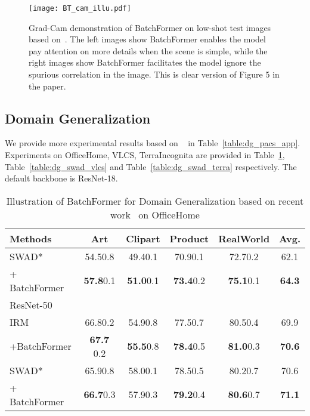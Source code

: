 \documentclass[10pt,twocolumn,letterpaper]{article}
\begin{document}
\begin{figure*}
    \centering
    \texttt{[image: BT\_cam\_illu.pdf]}
\caption{Grad-Cam demonstration of BatchFormer on low-shot test images based on~\cite{ren2020balanced}. The left images show BatchFormer enables the model pay attention on more details when the scene is simple, while the right images show BatchFormer facilitates the model ignore the spurious correlation in the image. This is clear version of Figure 5 in the paper.}
    \label{fig:cam_illu_app}
\end{figure*}


\subsection{Domain Generalization}

We provide more experimental results based on ~\cite{dalib} in Table~\ref{table:dg_pacs_app}. Experiments on OfficeHome, VLCS, TerraIncognita are provided in Table~\ref{table:dg_swad_officehome}, Table~\ref{table:dg_swad_vlcs} and Table~\ref{table:dg_swad_terra} respectively. The default backbone is ResNet-18.



\begin{table}[tp]
\small
\setlength\tabcolsep{2.5pt}
\caption{Illustration of BatchFormer for Domain Generalization based on recent work~\cite{cha2021swad} on OfficeHome }
\label{table:dg_swad_officehome}
\centering
\begin{tabular}{@{}lccccc@{}}
\hline
Methods  &  Art   & Clipart   & Product   & RealWorld & Avg.  \\
\hline
SWAD*~\cite{cha2021swad} & 54.50.8 & 49.40.1 & 70.90.1 & 72.70.2 & 62.1 \\
 + BatchFormer & {\bf 57.8}0.1 & {\bf 51.0}0.1 & {\bf 73.4}0.2 & {\bf 75.1}0.1 & {\bf 64.3}\\
\hline\hline
ResNet-50 \\
\hline\hline
IRM~\cite{arjovsky2019invariant} & 66.80.2  &  54.90.8  &  77.50.7 & 80.50.4  & 69.9 \\
+BatchFormer    & {\bf 67.7} 0.2  & {\bf 55.5}0.8  & {\bf 78.4}0.5 & {\bf 81.0}0.3  & {\bf 70.6}\\

\hline
SWAD*~\cite{cha2021swad} & 65.90.8 & 58.00.1 & 78.50.5 & 80.20.7 & 70.6\\
 + BatchFormer & {\bf 66.7}0.3 & 57.90.3 & {\bf 79.2}0.4 & {\bf 80.6}0.7 & {\bf 71.1}\\


\hline
\end{tabular}
\end{table}
\end{document}
